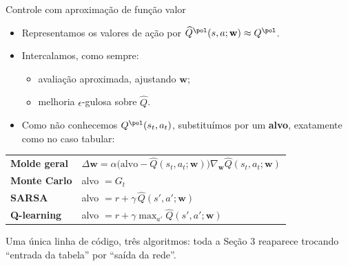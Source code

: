 \documentclass[aspectratio=169, 11pt]{beamer}
\newcommand{\Qhat}{\widehat{Q}}
\newcommand{\wv}{\mathbf{w}}
\begin{document}
\begin{frame}{Controle com aproximação de função valor}

  \begin{itemize}\setlength{\itemsep}{0.35ex}
    \item Representamos os valores de ação por $\Qhat^{\pol}(s,a;\wv) \approx Q^{\pol}$.
    \item Intercalamos, como sempre:
      \begin{itemize}\setlength{\itemsep}{0.15ex}
        \item avaliação aproximada, ajustando $\wv$;
        \item melhoria $\epsilon$-gulosa sobre $\Qhat$.
      \end{itemize}
    \item Como não conhecemos $Q^{\pol}(s_t,a_t)$, substituímos por um
      \textbf{alvo}, exatamente como no caso tabular:
  \end{itemize}

  \smallskip
  {\small
  \begin{tabular}{@{}ll@{}}
    \textbf{Molde geral} & $\Delta\wv = \alpha\bigl(\text{alvo} - \Qhat(s_t,a_t;\wv)\bigr)\nabla_{\wv}\Qhat(s_t,a_t;\wv)$\\[0.7ex]
    \textbf{Monte Carlo} & alvo $= G_t$ \\[0.5ex]
    \textbf{SARSA} & alvo $= r + \gamma\,\Qhat(s',a';\wv)$ \\[0.5ex]
    \textbf{Q-learning} & alvo $= r + \gamma \max_{a'} \Qhat(s',a';\wv)$ \\
  \end{tabular}}

  \smallskip
  {\small Uma única linha de código, três algoritmos: toda a Seção 3
  reaparece trocando ``entrada da tabela'' por ``saída da rede''.}
\end{frame}
\end{document}
